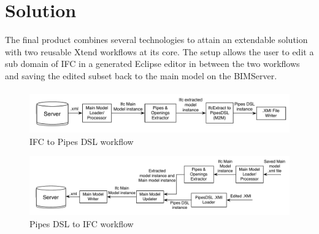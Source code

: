 \section{Solution}
The final product combines several technologies to attain an extendable solution with two reusable Xtend workflows at its core. The setup allows the user to edit a sub domain of IFC in a generated Eclipse editor in between the two workflows and saving the edited subset back to the main model on the BIMServer.
\paragraph{}
\begin{figure}[htbp]
    \centering
        \includegraphics[width=120mm]{images/IFC2Pipes.pdf}
    \caption{IFC to Pipes DSL workflow}
    \label{fig:IFC2PipesWorkflow}
\end{figure}
\begin{figure}[htbp]
    \centering
        \includegraphics[width=120mm]{images/Pipes2IFC.pdf}
    \caption{Pipes DSL to IFC workflow}
    \label{fig:Pipes2IFCWorkflow}
\end{figure}